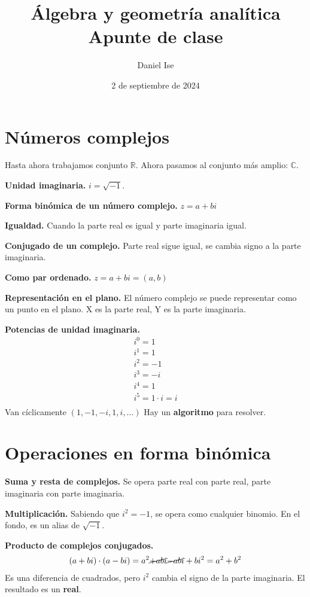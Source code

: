 \documentclass{article}
\title{Álgebra y geometría analítica\\Apunte de clase}
\author{Daniel Ise}
\date{2 de septiembre de 2024}
\begin{document}
\maketitle

\section*{Números complejos}

Hasta ahora trabajamos conjunto \(\mathbb{R}\).
Ahora pasamos al conjunto más amplio: \(\mathbb{C}\).

\textbf{Unidad imaginaria.}
\(i = \sqrt{-1}\).

\textbf{Forma binómica de un número complejo.}
\(z = a + b i\)

\textbf{Igualdad.}
Cuando la parte real es igual y parte imaginaria igual.

\textbf{Conjugado de un complejo.}
Parte real sigue igual, se cambia signo a la parte imaginaria.

\textbf{Como par ordenado.}
\(z = a + b i = (a,b)\)

\textbf{Representación en el plano.}
El número complejo se puede representar como un punto en el plano.
X es la parte real, Y es la parte imaginaria.

\textbf{Potencias de unidad imaginaria.}
\begin{align*}
    i^0 = 1             \\
    i^1 = 1             \\
    i^2 = -1            \\
    i^3 = -i            \\
    i^4 = 1             \\
    i^5 = 1 \cdot i = i \\
\end{align*}
Van cíclicamente \((1, -1 , -i, 1, i, \dots)\)
Hay un \textbf{algoritmo} para resolver.

\section*{Operaciones en forma binómica}

\textbf{Suma y resta de complejos.}
Se opera parte real con parte real,
parte imaginaria con parte imaginaria.

\textbf{Multiplicación.}
Sabiendo que \(i^2 = -1\), se opera como cualquier binomio.
En el fondo, es un alias de \(\sqrt{-1}\).

\textbf{Producto de complejos conjugados.}
\begin{align*}
    (a+bi) \cdot (a-bi) = a^2 \cancel{+ abi} \cancel{- abi} + bi^2 = a^2 + b^2
\end{align*}
Es una diferencia de cuadrados,
pero \(i^2\) cambia el signo de la parte imaginaria.
El resultado es un \textbf{real}.
\end{document}
